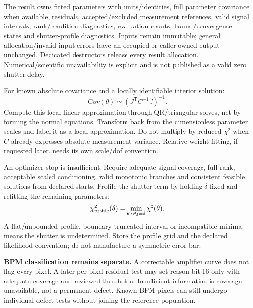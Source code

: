 \documentclass[11pt,a4paper]{article}
\begin{document}
The result owns fitted parameters with units/identities, full parameter
covariance when available, residuals, accepted/excluded measurement references,
valid signal intervals, rank/condition diagnostics, evaluation counts,
bound/convergence states and shutter-profile diagnostics.
Inputs remain immutable; general allocation/invalid-input errors leave an
occupied or caller-owned output unchanged. Dedicated destructors release every
result allocation. Numerical/scientific unavailability is explicit and is
not published as a valid zero shutter delay.

For known absolute covariance and a locally identifiable interior solution:
\[
\mathrm{Cov}(\theta)\simeq
\left(J^{\mathsf T}C^{-1}J\right)^{-1}.
\]
Compute this local linear approximation through QR/triangular solves, not by
forming the normal equations. Transform back from the dimensionless parameter
scales and label it as a local approximation. Do not multiply by reduced
$\chi^2$ when $C$ already expresses absolute measurement variance.
Relative-weight fitting, if requested later, needs its own scale/dof convention.

An optimizer stop is insufficient. Require adequate signal coverage, full rank,
acceptable scaled conditioning, valid monotonic branches and consistent
feasible solutions from declared starts. Profile the shutter term by holding
$\delta$ fixed and refitting the remaining parameters:
\[
\chi^2_{\rm profile}(\delta)=
\min_{\theta\,:\,\theta_\delta=\delta}\chi^2(\theta).
\]
A flat/unbounded profile, boundary-truncated interval or incompatible minima
means the shutter is undetermined. Store the profile grid and the declared
likelihood convention; do not manufacture a symmetric error bar.

\textbf{BPM classification remains separate.} A correctable amplifier curve does
not flag every pixel. A later per-pixel residual test may set reason bit 16 only
with adequate coverage and reviewed thresholds. Insufficient information is
coverage-unavailable, not a permanent defect. Known BPM pixels can still undergo
individual defect tests without joining the reference population.
\end{document}
